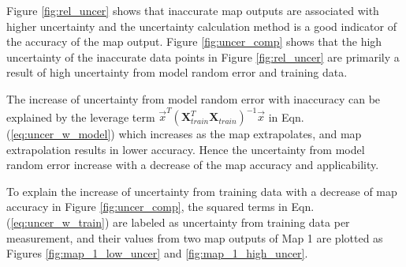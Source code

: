 Figure \ref{fig:rel_uncer} shows that inaccurate map outputs are associated with higher uncertainty and the uncertainty calculation method is a good indicator of the accuracy of the map output. Figure \ref{fig:uncer_comp} shows that the high uncertainty of the inaccurate data points in Figure \ref{fig:rel_uncer} are primarily a result of high uncertainty from model random error and training data.

The increase of uncertainty from model random error with inaccuracy can be explained by the leverage term ${\vec x^T}{({\mathbf{X}}_{train}^T{{\mathbf{X}}_{train}})^{ - 1}}\vec x$ in Eqn. (\ref{eq:uncer_w_model}) which increases as the map extrapolates, and map extrapolation results in lower accuracy. Hence the uncertainty from model random error increase with a decrease of the map accuracy and applicability.

To explain the increase of uncertainty from training data with a decrease of map accuracy in Figure \ref{fig:uncer_comp}, the squared terms in Eqn. (\ref{eq:uncer_w_train}) are labeled as uncertainty from training data per measurement, and their values from two map outputs of Map 1 are plotted as Figures \ref{fig:map_1_low_uncer} and \ref{fig:map_1_high_uncer}.

